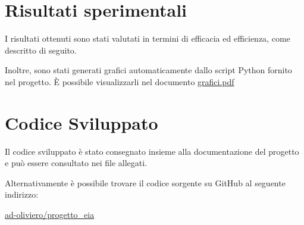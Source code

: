 \documentclass{ol-softwaremanual}
\begin{document}
\section{Risultati sperimentali}
I risultati ottenuti sono stati valutati in termini di efficacia ed efficienza, come descritto di seguito.

Inoltre, sono stati generati grafici automaticamente dallo script Python fornito nel progetto.
È possibile visualizzarli nel documento \href{run:grafici.pdf}{grafici.pdf}




\section{Codice Sviluppato}
Il codice sviluppato è stato consegnato insieme alla documentazione del progetto e può essere consultato nei file allegati.

Alternativamente è possibile trovare il codice sorgente su GitHub al seguente indirizzo:

\href{https://github.com/ad-oliviero/progetto_eia}{ad-oliviero/progetto\_eia}

\newpage
\nocite{kumar2016edge,kumar2018rev2,jleskovec2009community,klimmt2004introducing,yang2012defining,leskovec2005graphs}
\printbibliography
\end{document}
